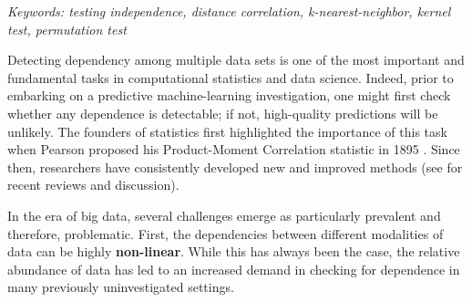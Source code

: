 \documentclass[11pt]{article}
\begin{document}
\noindent%
{\it Keywords: testing independence, distance correlation, k-nearest-neighbor, kernel test, permutation test}

\setcounter{tocdepth}{2}%





{}



Detecting dependency among multiple data sets is one of the most important and fundamental tasks in computational statistics and data science.
Indeed, prior to embarking on a predictive machine-learning investigation, one might first check whether any dependence is detectable; if not, high-quality predictions will be unlikely.
The founders of statistics first highlighted the importance of this task when Pearson proposed his Product-Moment Correlation statistic in 1895 \cite{Pearson1895}.  Since then, researchers have consistently developed new and improved methods (see \cite{Reimherr2013,JosseHolmes2013} for  recent reviews and discussion).

In the era of big data, several challenges emerge as particularly prevalent and therefore, problematic.
%
First, the dependencies between different modalities of data can be highly \textbf{non-linear}.  While this has always been the case, the relative abundance of data has led to an increased demand in checking for dependence in many previously uninvestigated settings.
\end{document}
